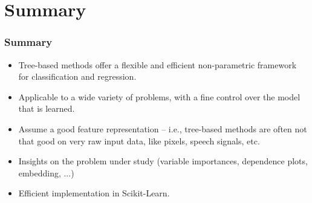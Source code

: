 \documentclass{beamer}
\begin{document}

\section{Summary}

\begin{frame}
  \frametitle{Summary}

  \begin{itemize}
        \item Tree-based methods offer a {\color{blue}flexible and efficient non-parametric} framework
              for classification and regression.

        \vspace{0.25cm}

        \item Applicable to a wide variety of problems, with a {\color{blue}fine control}
              over the model that is learned.

        \vspace{0.25cm}

        \item Assume a good feature representation -- i.e., tree-based methods are often {\color{red}not that good on very
              raw input data}, like pixels, speech signals, etc.

        \vspace{0.25cm}

        \item {\color{blue}Insights on the problem} under study (variable importances,
              dependence plots, embedding, ...)

        \vspace{0.25cm}

        \item {\color{blue}Efficient implementation} in Scikit-Learn.
  \end{itemize}
\end{frame}
\end{document}
